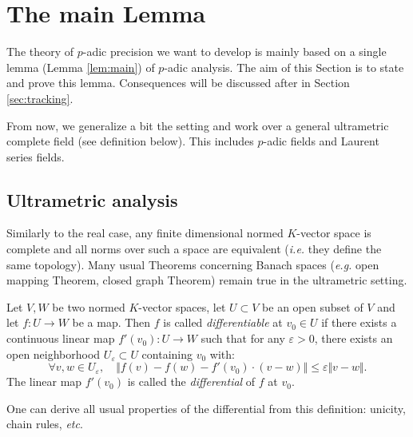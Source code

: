 \documentclass{lms}
\begin{document}
\section{The main Lemma}
\label{sec:mainlemma}

The theory of $p$-adic precision we want to develop is mainly based on a 
single lemma (Lemma \ref{lem:main}) of $p$-adic analysis. The aim of 
this Section is to state and prove this lemma. Consequences will be 
discussed after in Section \ref{sec:tracking}.

From now, we generalize a bit the setting and work over a general 
ultrametric complete field (see definition below). This includes 
$p$-adic fields and Laurent series fields.

\subsection{Ultrametric analysis}
\label{ssec:ultrametric}



Similarly to the real case, any finite dimensional normed $K$-vector 
space is complete and all norms over such a space are equivalent 
(\emph{i.e.} they define the same topology). Many usual Theorems 
concerning Banach spaces (\emph{e.g.} open mapping Theorem, closed graph 
Theorem) remain true in the ultrametric setting.

\begin{deftn} \label{deftn : diff}
Let $V, W$ be two normed $K$-vector spaces, let $U \subset V$ be an open 
subset of $V$ and let $f : U \rightarrow W$ be a map. Then $f$ is called 
\emph{differentiable} at $v_0 \in U$ if there exists a 
continuous linear map $f'(v_0) : U \rightarrow W$ such that for any 
$\varepsilon >0$, there exists an open neighborhood $U_\varepsilon 
\subset U$ containing $v_0$ with:
\[ 
\forall v, w \in U_\varepsilon, \quad
\Vert f(v)-f(w)-f'(v_0) \cdot \left( v-w \right) \Vert 
\leq \varepsilon \Vert v-w \Vert. 
\]
The linear map $f'(v_0)$ is called the \emph{differential} of $f$ at $v_0$.
\end{deftn}

One can derive all usual properties of the differential from this 
definition: unicity, chain rules, \emph{etc}.



\end{document}
